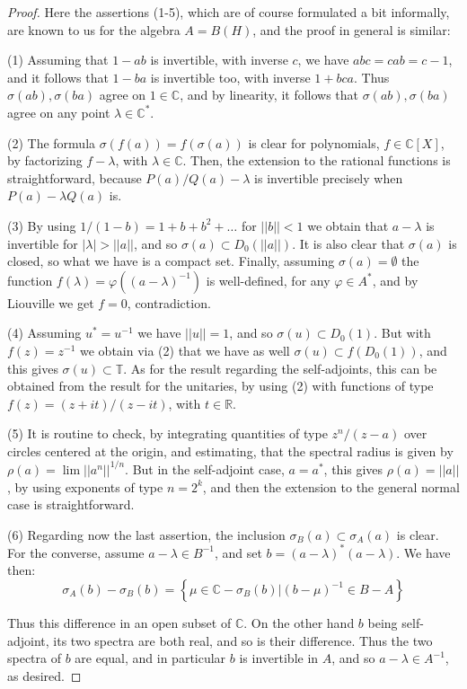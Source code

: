 \documentclass[12pt]{amsbook}
\begin{document}
\begin{proof}
Here the assertions (1-5), which are of course formulated a bit informally, are known to us for the algebra $A=B(H)$, and the proof in general is similar:

\medskip

(1) Assuming that $1-ab$ is invertible, with inverse $c$, we have $abc=cab=c-1$, and it follows that $1-ba$ is invertible too, with inverse $1+bca$. Thus $\sigma(ab),\sigma(ba)$ agree on $1\in\mathbb C$, and by linearity, it follows that $\sigma(ab),\sigma(ba)$ agree on any point $\lambda\in\mathbb C^*$.

\medskip

(2) The formula $\sigma(f(a))=f(\sigma(a))$ is clear for polynomials, $f\in\mathbb C[X]$, by factorizing $f-\lambda$, with $\lambda\in\mathbb C$. Then, the extension to the rational functions is straightforward, because $P(a)/Q(a)-\lambda$ is invertible precisely when $P(a)-\lambda Q(a)$ is.

\medskip

(3) By using $1/(1-b)=1+b+b^2+\ldots$ for $||b||<1$ we obtain that $a-\lambda$ is invertible for $|\lambda|>||a||$, and so $\sigma(a)\subset D_0(||a||)$. It is also clear that $\sigma(a)$ is closed, so what we have is a compact set. Finally, assuming $\sigma(a)=\emptyset$ the function $f(\lambda)=\varphi((a-\lambda)^{-1})$ is well-defined, for any $\varphi\in A^*$, and by Liouville we get $f=0$, contradiction.

\medskip

(4) Assuming $u^*=u^{-1}$ we have $||u||=1$, and so $\sigma(u)\subset D_0(1)$. But with $f(z)=z^{-1}$ we obtain via (2) that we have as well $\sigma(u)\subset f(D_0(1))$, and this gives $\sigma(u)\subset\mathbb T$. As for the result regarding the self-adjoints, this can be obtained from the result for the unitaries, by using (2) with functions of type $f(z)=(z+it)/(z-it)$, with $t\in\mathbb R$.

\medskip

(5) It is routine to check, by integrating quantities of type $z^n/(z-a)$ over circles centered at the origin, and estimating, that the spectral radius is given by $\rho(a)=\lim||a^n||^{1/n}$. But in the self-adjoint case, $a=a^*$, this gives $\rho(a)=||a||$, by using exponents of type $n=2^k$, and then the extension to the general normal case is straightforward.

\medskip 

(6) Regarding now the last assertion, the inclusion $\sigma_B(a)\subset\sigma_A(a)$ is clear. For the converse, assume $a-\lambda\in B^{-1}$, and set $b=(a-\lambda )^*(a-\lambda )$. We have then:
$$\sigma_A(b)-\sigma_B(b)=\left\{\mu\in\mathbb C-\sigma_B(b)\Big|(b-\mu)^{-1}\in B-A\right\}$$

Thus this difference in an open subset of $\mathbb C$. On the other hand $b$ being self-adjoint, its two spectra are both real, and so is their difference. Thus the two spectra of $b$ are equal, and in particular $b$ is invertible in $A$, and so $a-\lambda\in A^{-1}$, as desired.
\end{proof}
\end{document}
